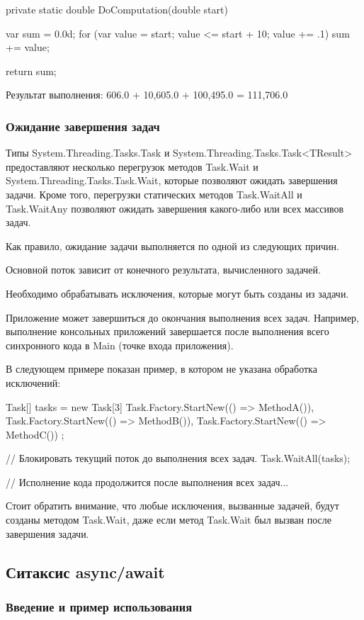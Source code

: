 private static double DoComputation(double start)
{
  var sum = 0.0d;
  for (var value = start; value <= start + 10; value += .1)
     sum += value;

  return sum; 
}

Результат выполнения:
606.0 + 10,605.0 + 100,495.0 = 111,706.0

\subsubsection{Ожидание завершения задач}

Типы System.Threading.Tasks.Task и System.Threading.Tasks.Task<TResult> предоставляют несколько перегрузок методов Task.Wait и System.Threading.Tasks.Task.Wait, которые позволяют ожидать завершения задачи. Кроме того, перегрузки статических методов Task.WaitAll и Task.WaitAny позволяют ожидать завершения какого-либо или всех массивов задач.

Как правило, ожидание задачи выполняется по одной из следующих причин.

Основной поток зависит от конечного результата, вычисленного задачей.

Необходимо обрабатывать исключения, которые могут быть созданы из задачи.

Приложение может завершиться до окончания выполнения всех задач. Например, выполнение консольных приложений завершается после выполнения всего синхронного кода в Main (точке входа приложения).

В следующем примере показан пример, в котором не указана обработка исключений:

Task[] tasks = new Task[3]
{
    Task.Factory.StartNew(() => MethodA()),
    Task.Factory.StartNew(() => MethodB()),
    Task.Factory.StartNew(() => MethodC())
};

// Блокировать текущий поток до выполнения всех задач.
Task.WaitAll(tasks);

// Исполнение кода продолжится после выполнения всех задач...

Стоит обратить внимание, что любые исключения, вызванные задачей, будут созданы методом Task.Wait, даже если метод Task.Wait был вызван после завершения задачи.


\subsection{Ситаксис async/await}

\subsubsection{Введение и пример использования}


